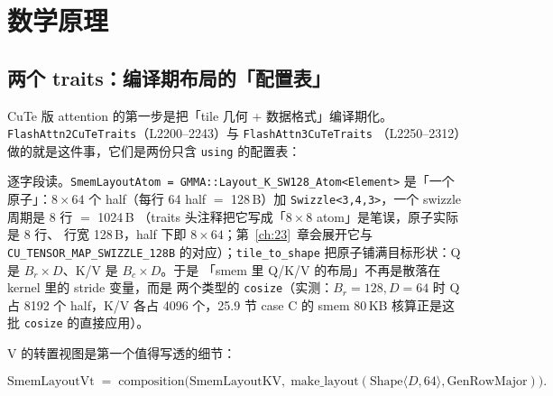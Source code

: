 \section{数学原理}

\subsection{两个 traits：编译期布局的「配置表」}

CuTe 版 attention 的第一步是把「tile 几何 + 数据格式」编译期化。
\texttt{Flash\allowbreak{}Attn2\allowbreak{}Cu\allowbreak{}Te\allowbreak{}Traits}（L2200--2243）与 \texttt{Flash\allowbreak{}Attn3\allowbreak{}Cu\allowbreak{}Te\allowbreak{}Traits}
（L2250--2312）做的就是这件事，它们是两份只含 \texttt{using} 的配置表：



逐字段读。\texttt{Smem\allowbreak{}Layout\allowbreak{}Atom =\allowbreak{} GMMA::\allowbreak{}Layout\_\allowbreak{}K\_\allowbreak{}SW128\_\allowbreak{}Atom\allowbreak{}<Element>}
是「一个原子」：$8\times64$ 个 half（每行 64 half $=$ 128\,B）加
\texttt{Swizzle\allowbreak{}<3,\allowbreak{}4,\allowbreak{}3>}，一个 swizzle 周期是 8 行 $=$ 1024\,B
（traits 头注释把它写成「$8\times8$ atom」是笔误，原子实际是 8 行、
行宽 128\,B，half 下即 $8\times64$；第~\ref{ch:23}~章会展开它与
\texttt{CU\_\allowbreak{}TENSOR\_\allowbreak{}MAP\_\allowbreak{}SWIZZLE\_\allowbreak{}128B} 的对应）；\texttt{tile\_\allowbreak{}to\_\allowbreak{}shape}
把原子铺满目标形状：Q 是 $B_r\times D$、K/V 是 $B_c\times D$。于是
「smem 里 Q/K/V 的布局」不再是散落在 kernel 里的 stride 变量，而是
两个类型的 \texttt{cosize}（实测：$B_r{=}128,D{=}64$ 时 Q 占 8192 个
half，K/V 各占 4096 个，25.9 节 case C 的 smem 80\,KB 核算正是这批
\texttt{cosize} 的直接应用）。

V 的转置视图是第一个值得写透的细节：

\begin{equation}
  \mathrm{SmemLayoutVt} \;=\; \mathrm{composition}\bigl(\mathrm{SmemLayoutKV},\;
  \mathrm{make\_layout}(\mathrm{Shape}\langle D, 64\rangle, \mathrm{GenRowMajor})\bigr).
  \label{eq:25-vt}
\end{equation}

